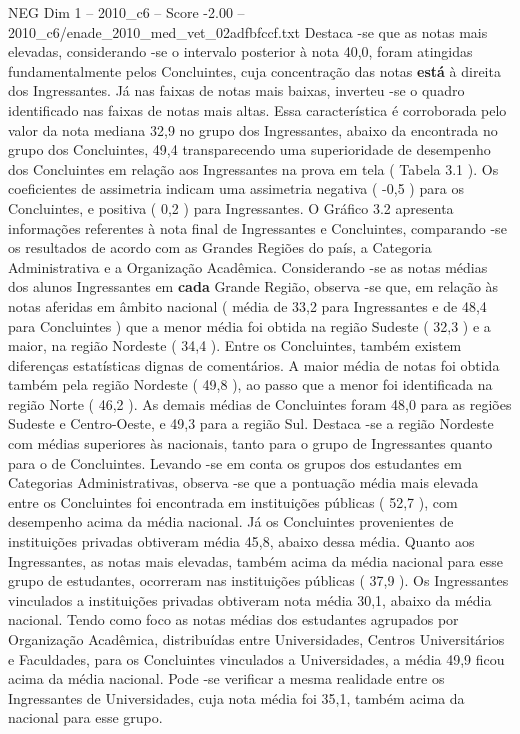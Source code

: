 \begin{textsample}{NEG Dim 1 – 2010\_c6 – Score -2.00 – 2010\_c6/enade\_2010\_med\_vet\_02adfbfccf.txt}
Destaca -se que as notas mais elevadas, considerando -se o intervalo posterior à nota 40,0, foram atingidas fundamentalmente pelos Concluintes, cuja concentração das notas \textbf{está} à direita dos Ingressantes.
Já nas faixas de notas mais baixas, inverteu -se o quadro identificado nas faixas de notas mais altas.
Essa característica é corroborada pelo valor da nota mediana 32,9 no grupo dos Ingressantes, abaixo da encontrada no grupo dos Concluintes, 49,4 transparecendo uma superioridade de desempenho dos Concluintes em relação aos Ingressantes na prova em tela ( Tabela 3.1 ).
Os coeficientes de assimetria indicam uma assimetria negativa ( -0,5 ) para os Concluintes, e positiva ( 0,2 ) para Ingressantes.
O Gráfico 3.2 apresenta informações referentes à nota final de Ingressantes e Concluintes, comparando -se os resultados de acordo com as Grandes Regiões do país, a Categoria Administrativa e a Organização Acadêmica.
Considerando -se as notas médias dos alunos Ingressantes em \textbf{cada} Grande Região, observa -se que, em relação às notas aferidas em âmbito nacional ( média de 33,2 para Ingressantes e de 48,4 para Concluintes ) que a menor média foi obtida na região Sudeste ( 32,3 ) e a maior, na região Nordeste ( 34,4 ).
Entre os Concluintes, também existem diferenças estatísticas dignas de comentários.
A maior média de notas foi obtida também pela região Nordeste ( 49,8 ), ao passo que a menor foi identificada na região Norte ( 46,2 ).
As demais médias de Concluintes foram 48,0 para as regiões Sudeste e Centro-Oeste, e 49,3 para a região Sul.
Destaca -se a região Nordeste com médias superiores às nacionais, tanto para o grupo de Ingressantes quanto para o de Concluintes.
Levando -se em conta os grupos dos estudantes em Categorias Administrativas, observa -se que a pontuação média mais elevada entre os Concluintes foi encontrada em instituições públicas ( 52,7 ), com desempenho acima da média nacional.
Já os Concluintes provenientes de instituições privadas obtiveram média 45,8, abaixo dessa média.
Quanto aos Ingressantes, as notas mais elevadas, também acima da média nacional para esse grupo de estudantes, ocorreram nas instituições públicas ( 37,9 ).
Os Ingressantes vinculados a instituições privadas obtiveram nota média 30,1, abaixo da média nacional.
Tendo como foco as notas médias dos estudantes agrupados por Organização Acadêmica, distribuídas entre Universidades, Centros Universitários e Faculdades, para os Concluintes vinculados a Universidades, a média 49,9 ficou acima da média nacional.
Pode -se verificar a mesma realidade entre os Ingressantes de Universidades, cuja nota média foi 35,1, também acima da nacional para esse grupo.

\end{textsample}
